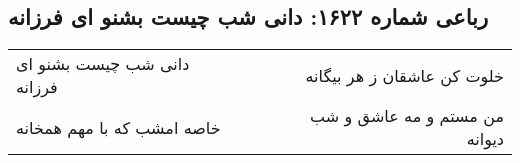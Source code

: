 \begin{center}
\section*{رباعی شماره ۱۶۲۲: دانی شب چیست بشنو ای فرزانه}
\label{sec:1622}
\begin{longtable}{l p{0.5cm} r}
دانی شب چیست بشنو ای فرزانه
&&
خلوت کن عاشقان ز هر بیگانه
\\
خاصه امشب که با مهم همخانه
&&
من مستم و مه عاشق و شب دیوانه
\\
\end{longtable}
\end{center}
